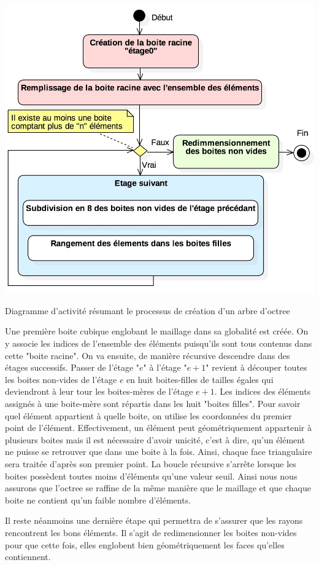 \begin{figureth}
	\includegraphics[width=0.7\linewidth]{images/DiagOctree}
	\caption{Diagramme d'activité résumant le processus de création d'un arbre d'octree}
	\label{DiagOctree}
\end{figureth}

Une première boite cubique englobant le maillage dans sa globalité est créée. On y associe les indices de l'ensemble des éléments puisqu'ils sont tous contenus dans cette "boite racine". On va ensuite, de manière récursive descendre dans des étages successifs. Passer de l'étage "$e$" à l'étage "$e+1$" revient à découper toutes les boites non-vides de l'étage $e$ en huit boites-filles de tailles égales qui deviendront à leur tour les boites-mères de l'étage $e+1$. Les indices des éléments assignés à une boite-mère sont répartis dans les huit "boites filles". Pour savoir quel élément appartient à quelle boite, on utilise les coordonnées du premier point de l'élément. Effectivement, un élément peut géométriquement appartenir à plusieurs boites mais il est nécessaire d'avoir unicité, c'est à dire, qu'un élément ne puisse se retrouver que dans une boite à la fois. Ainsi, chaque face triangulaire sera traitée d'après son premier point. La boucle récursive s'arrête lorsque les boites possèdent toutes moins d'éléments qu'une valeur seuil. Ainsi nous nous assurons que l'\gls{octree} se raffine de la même manière que le maillage et que chaque boite ne contient qu'un faible nombre d'éléments.


Il reste néanmoins une dernière étape qui permettra de s'assurer que les rayons rencontrent les bons éléments. Il s'agit de redimensionner les boites non-vides pour que cette fois, elles englobent bien géométriquement les faces qu'elles contiennent.



